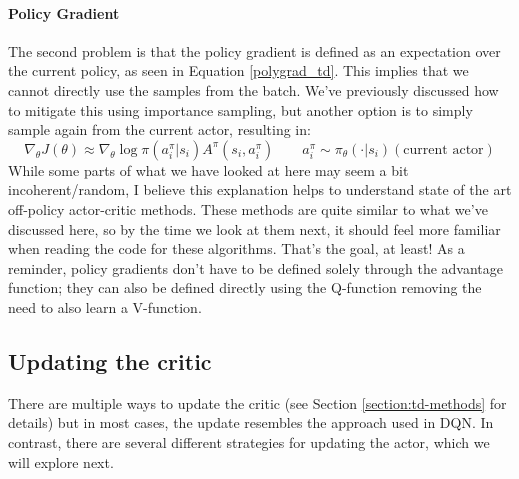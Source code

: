 \paragraph{Policy Gradient} The second problem is that the policy gradient is defined as an expectation over the current 
policy, as seen in Equation \ref{polygrad_td}. This implies that we cannot directly use the samples from the batch. 
We’ve previously discussed how to mitigate this using importance sampling, but another option is to simply
sample again from the current actor, resulting in:
$$\nabla_\theta J(\theta) \approx \nabla_\theta \log{\pi(a_i^\pi|s_i)A^\pi(s_i,a_i^\pi)} \qquad a_i^\pi \sim \pi_\theta(\cdot|s_i) (\text{current actor})$$
While some parts of what we have looked at here may seem a bit incoherent/random, I believe this explanation helps to 
understand state of the art off-policy actor-critic methods. These methods are quite similar to what we've discussed here,
so by the time we look at them next, it should feel more familiar when reading the code for these algorithms. 
That’s the goal, at least! As a reminder, policy gradients don't have to be defined solely through the 
advantage function; they can also be defined directly using the Q-function removing the need to also learn a V-function.



\subsection{Updating the critic}
There are multiple ways to update the critic (see Section \ref{section:td-methods} for details) but in most cases, the update 
resembles the approach used in DQN.\newline 
In contrast, there are several different strategies for updating the actor, which we will explore next.

